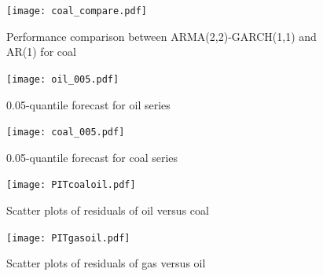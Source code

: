 \documentclass[12pt,a4paper]{article}
\numberwithin{equation}{section}
\begin{document}
\begin{figure}[H] 
\texttt{[image: coal\_compare.pdf]}
\vspace*{-23mm}
\caption{Performance comparison between ARMA(2,2)-GARCH(1,1) and AR(1) for coal}
\label{coal_compare}
\end{figure}

 \begin{figure}[H] 
\texttt{[image: oil\_005.pdf]}
\vspace*{-23mm}
\caption{0.05-quantile forecast for oil series}
\label{oil_005}
\end{figure}

\begin{figure}[H] 
\texttt{[image: coal\_005.pdf]}
\vspace*{-23mm}
\caption{0.05-quantile forecast for coal series}
\label{coal_005}
\end{figure}


\begin{figure}[H]
\centering
\texttt{[image: PITcoaloil.pdf]}
\vspace*{-15mm}
\caption{Scatter plots of residuals of oil versus coal} \label{PITcoaloil}
\end{figure}


\begin{figure}[H]
\centering
\texttt{[image: PITgasoil.pdf]}
\vspace*{-15mm}
\caption{Scatter plots of residuals of gas versus oil} \label{PITgasoil}
\end{figure}


 


%
%



\setcounter{equation}{0}
\renewcommand\theequation{\Alph{section}.\arabic{equation}}	
\setcounter{table}{0}
\renewcommand\thetable{\Alph{section}.\arabic{table}}
\setcounter{figure}{0}
\renewcommand\thefigure{\Alph{section}.\arabic{figure}}
\end{document}
